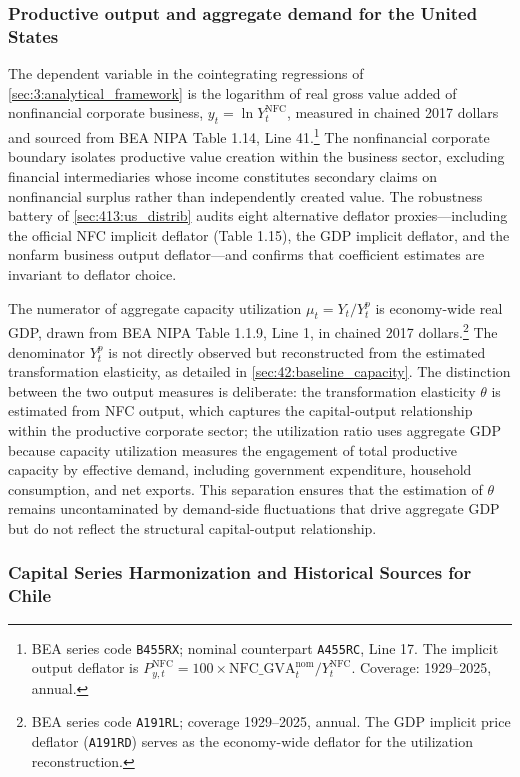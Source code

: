 \subsubsection{Productive output and aggregate demand for the United States}
The dependent variable in the cointegrating regressions of
\cref{sec:3:analytical_framework} is the logarithm of real gross
value added of nonfinancial corporate business,
$y_t = \ln Y^{\text{NFC}}_t$, measured in chained 2017 dollars and
sourced from BEA NIPA Table 1.14, Line 41.\footnote{BEA series
	code \texttt{B455RX}; nominal counterpart \texttt{A455RC}, Line 17.
	The implicit output deflator is $P^{\text{NFC}}_{y,t} = 100
	\times \text{NFC\_GVA}^{\text{nom}}_t /
	Y^{\text{NFC}}_t$. Coverage: 1929--2025, annual.} The
nonfinancial corporate boundary isolates productive value creation
within the business sector, excluding financial intermediaries whose
income constitutes secondary claims on nonfinancial surplus rather
than independently created value. The robustness battery of
\cref{sec:413:us_distrib} audits eight alternative deflator
proxies---including the official NFC implicit deflator (Table 1.15),
the GDP implicit deflator, and the nonfarm business output
deflator---and confirms that coefficient estimates are invariant to
deflator choice.

The numerator of aggregate capacity utilization $\mu_t = Y_t /
Y^p_t$ is economy-wide real GDP, drawn from BEA NIPA Table 1.1.9,
Line 1, in chained 2017 dollars.\footnote{BEA series code
	\texttt{A191RL}; coverage 1929--2025, annual. The GDP implicit
	price deflator (\texttt{A191RD}) serves as the economy-wide
	deflator for the utilization reconstruction.} The denominator
$Y^p_t$ is not directly observed but reconstructed from the
estimated transformation elasticity, as detailed in
\cref{sec:42:baseline_capacity}. The distinction between the two output
measures is deliberate: the transformation elasticity $\theta$ is
estimated from NFC output, which captures the capital-output
relationship within the productive corporate sector; the utilization
ratio uses aggregate GDP because capacity utilization measures the
engagement of total productive capacity by effective demand,
including government expenditure, household consumption, and net
exports. This separation ensures that the estimation of $\theta$
remains uncontaminated by demand-side fluctuations that drive
aggregate GDP but do not reflect the structural capital-output
relationship.

\subsubsection{Capital Series Harmonization and Historical Sources for Chile}
\label{sec:414:chile_sfc}

